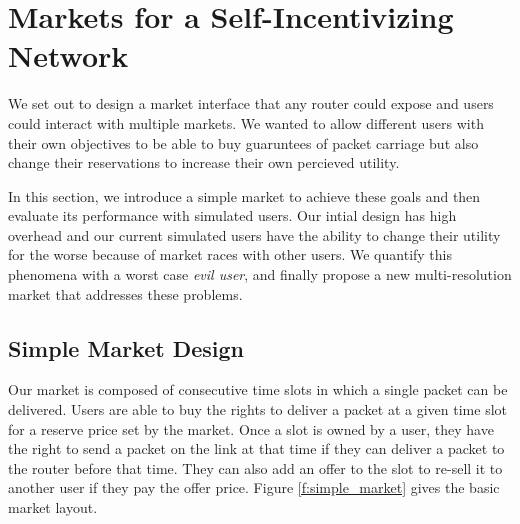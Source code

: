 \newlength{\slotwidth}
\setlength{\slotwidth}{.103\textwidth}

\section{Markets for a Self-Incentivizing Network}
\label{sec:designs}
We set out to design a market interface that any router could expose and users could interact with multiple markets.
We wanted to allow different users with their own objectives to be able to buy guaruntees of packet carriage but also change their reservations to increase their own percieved utility.

In this section, we introduce a simple market to achieve these goals and then evaluate its performance with simulated users.
Our intial design has high overhead and our current simulated users have the ability to change their utility for the worse because of market races with other users. We quantify this phenomena with a worst case \emph{evil user}, and finally propose a new multi-resolution market that addresses these problems.

%
%
%
%

\subsection{Simple Market Design}
Our market is composed of consecutive time slots in which a single packet can be delivered. Users are able to buy the rights to deliver a packet at a given time slot for a reserve price set by the market. Once a slot is owned by a user, they have the right to send a packet on the link at that time if they can deliver a packet to the router before that time. They can also add an offer to the slot to re-sell it to another user if they pay the offer price. Figure \ref{f:simple_market} gives the basic market layout.

